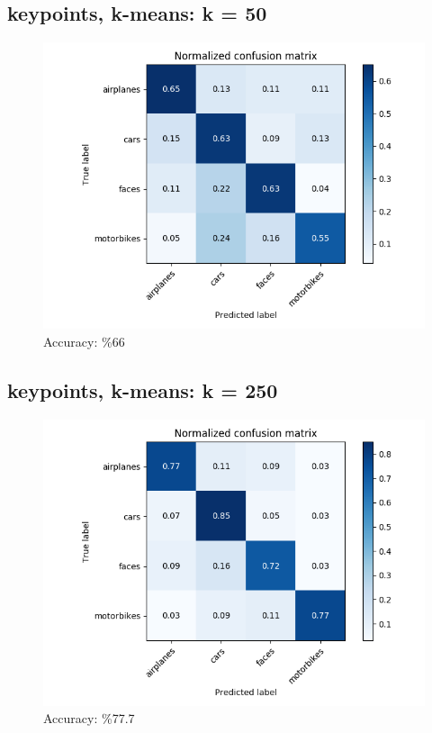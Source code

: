 \subsection*{keypoints, k-means: k = 50}
\begin{figure}[H]
    \centering
    \includegraphics[scale = 0.45]{images/confusion-kp-50.png}
    \caption*{Accuracy: \%66}
\end{figure}

\subsection*{keypoints, k-means: k = 250}
\begin{figure}[H]
    \centering
    \includegraphics[scale = 0.45]{images/confusion-kp-250.png}
    \caption*{Accuracy: \%77.7}
\end{figure}


